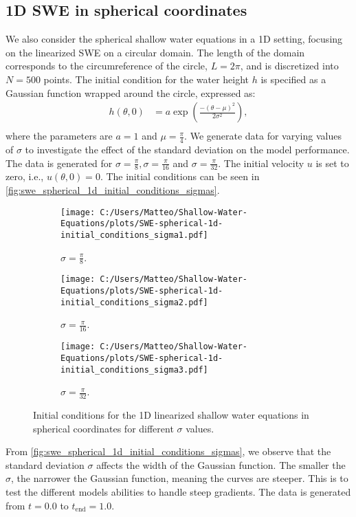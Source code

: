 \subsection*{1D SWE in spherical coordinates}
We also consider the spherical shallow water equations in a 1D setting, focusing on the linearized SWE on a circular domain.
The length of the domain corresponds to the circumreference of the circle, $L = 2\pi$, and is discretized into $N = 500$ points.
The initial condition for the water height $h$ is specified as a Gaussian function wrapped around the circle, expressed as:
\begin{align*}
    h(\theta, 0) &= a \exp \left( \frac{-{(\theta-\mu)}^2}{2 \sigma^2} \right) ,\\
\end{align*}
where the parameters are $a = 1$ and $\mu = \frac{\pi}{4}$.
We generate data for varying values of $\sigma$ to investigate the effect of the standard deviation on the model performance.
The data is generated for $\sigma = \frac{\pi}{8}, \sigma = \frac{\pi}{16}$ and $\sigma = \frac{\pi}{32}$.
The initial velocity $u$ is set to zero, i.e., $u(\theta,0) = 0$.
The initial conditions can be seen in \autoref{fig:swe_spherical_1d_initial_conditions_sigmas}.
\begin{figure}[H]
    \centering
    \begin{subfigure}[b]{0.3\textwidth}
        \centering
        \texttt{[image: C:/Users/Matteo/Shallow-Water-Equations/plots/SWE-spherical-1d-initial\_conditions\_sigma1.pdf]}
        \caption{$\sigma = \frac{\pi}{8}$.}\label{fig:swe_spherical_1d_sigma1}
    \end{subfigure}
    \hfill
    \begin{subfigure}[b]{0.3\textwidth}
        \centering
        \texttt{[image: C:/Users/Matteo/Shallow-Water-Equations/plots/SWE-spherical-1d-initial\_conditions\_sigma2.pdf]}
        \caption{$\sigma = \frac{\pi}{16}$.}\label{fig:swe_spherical_1d_sigma2}
    \end{subfigure}
    \hfill
    \begin{subfigure}[b]{0.3\textwidth}
        \centering
        \texttt{[image: C:/Users/Matteo/Shallow-Water-Equations/plots/SWE-spherical-1d-initial\_conditions\_sigma3.pdf]}
        \caption{$\sigma = \frac{\pi}{32}$.}\label{fig:swe_spherical_1d_sigma3}
    \end{subfigure}
    \caption{Initial conditions for the 1D linearized shallow water equations in spherical coordinates for different \(\sigma\) values.}\label{fig:swe_spherical_1d_initial_conditions_sigmas}
\end{figure}
From \autoref{fig:swe_spherical_1d_initial_conditions_sigmas}, we observe that the standard deviation \(\sigma\) affects the width of the Gaussian function.
The smaller the $\sigma$, the narrower the Gaussian function, meaning the curves are steeper.
This is to test the different models abilities to handle steep gradients.
The data is generated from $t = 0.0$ to $t_{\text{end}} = 1.0$.

